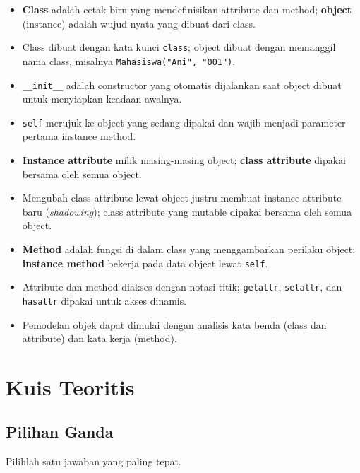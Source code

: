 \begin{itemize}
  \item \textbf{Class} adalah cetak biru yang mendefinisikan attribute dan method; \textbf{object} (instance) adalah wujud nyata yang dibuat dari class.
  \item Class dibuat dengan kata kunci \texttt{class}; object dibuat dengan memanggil nama class, misalnya \texttt{Mahasiswa("Ani", "001")}.
  \item \texttt{\_\_init\_\_} adalah constructor yang otomatis dijalankan saat object dibuat untuk menyiapkan keadaan awalnya.
  \item \texttt{self} merujuk ke object yang sedang dipakai dan wajib menjadi parameter pertama instance method.
  \item \textbf{Instance attribute} milik masing-masing object; \textbf{class attribute} dipakai bersama oleh semua object.
  \item Mengubah class attribute lewat object justru membuat instance attribute baru (\emph{shadowing}); class attribute yang mutable dipakai bersama oleh semua object.
  \item \textbf{Method} adalah fungsi di dalam class yang menggambarkan perilaku object; \textbf{instance method} bekerja pada data object lewat \texttt{self}.
  \item Attribute dan method diakses dengan notasi titik; \texttt{getattr}, \texttt{setattr}, dan \texttt{hasattr} dipakai untuk akses dinamis.
  \item Pemodelan objek dapat dimulai dengan analisis kata benda (class dan attribute) dan kata kerja (method).
\end{itemize}

\section{Kuis Teoritis}

\subsection{Pilihan Ganda}

Pilihlah satu jawaban yang paling tepat.

